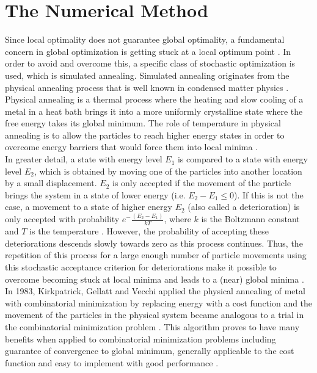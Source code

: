 \section{The Numerical Method}
\label{sec:related}

Since local optimality does not guarantee global optimality, a fundamental concern in global optimization is getting stuck at a local optimum point \cite{dekkers}. In order to avoid and overcome this, a specific class of stochastic optimization is used, which is simulated annealing. Simulated annealing originates from the physical annealing process that is well known in condensed matter physics \cite{dekkers}. Physical annealing is a thermal process where the heating and slow cooling of a metal in a heat bath brings it into a more uniformly crystalline state where the free energy takes its global minimum. The role of temperature in physical annealing is to allow the particles to reach higher energy states in order to overcome energy barriers that would force them into local minima \cite{neumaier}. \\
\hspace*{3mm}In greater detail, a state with energy level $E_1$ is compared to a state with energy level $E_2$, which is obtained by moving one of the particles into another location by a small displacement. $E_2$ is only accepted if the movement of the particle brings the system in a state of lower energy (i.e. $E_2-E_1\leq0$). If this is not the case, a movement to a state of higher energy $E_2$ (also called a deterioration) is only accepted with probability 
$e^-{\frac{(E_2-E_1)}{kT}}$, where $k$ is the Boltzmann constant and $T$ is the temperature \cite{dekkers}. However, the probability of accepting these deteriorations descends slowly towards zero as this process continues. Thus, the repetition of this process for a large enough number of particle movements using this stochastic acceptance criterion for deteriorations make it possible to overcome becoming stuck at local minima and leads to a (near) global minima \cite{dekkers}.\\
\hspace*{3mm}In 1983, Kirkpatrick, Gellatt and Vecchi applied the physical annealing of metal with combinatorial minimization by replacing energy with a cost function and the movement of the particles in the physical system became analogous to a trial in the combinatorial minimization problem \cite{dekkers}. This algorithm proves to have many benefits when applied to combinatorial minimization problems including guarantee of convergence to global minimum, generally applicable to the cost function and easy to implement with good performance \cite{dekkers}. \\
